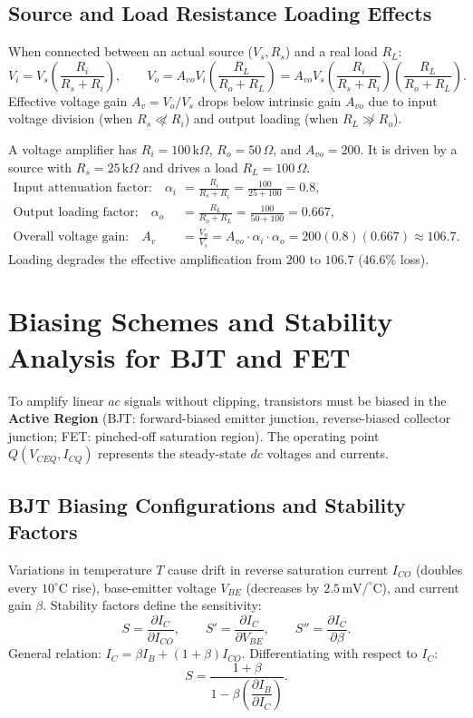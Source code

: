 \documentclass[12pt,a4paper]{article}
\begin{document}
\subsection{Source and Load Resistance Loading Effects}
When connected between an actual source ($V_s, R_s$) and a real load $R_L$:
\[
V_i = V_s \left(\frac{R_i}{R_s + R_i}\right),\qquad
V_o = A_{vo} V_i \left(\frac{R_L}{R_o + R_L}\right) = A_{vo} V_s \left(\frac{R_i}{R_s + R_i}\right)\left(\frac{R_L}{R_o + R_L}\right).
\]
Effective voltage gain $A_v = V_o/V_s$ drops below intrinsic gain $A_{vo}$ due to input voltage division (when $R_s \not\ll R_i$) and output loading (when $R_L \not\gg R_o$).

\begin{tcolorbox}[examplebox, title={Amplifier Loading Effect Calculation}]
A voltage amplifier has $R_i = 100\,\mathrm{k}\Omega$, $R_o = 50\,\Omega$, and $A_{vo} = 200$. It is driven by a source with $R_s = 25\,\mathrm{k}\Omega$ and drives a load $R_L = 100\,\Omega$.
\[
\begin{aligned}
\text{Input attenuation factor:}\quad \alpha_i &= \frac{R_i}{R_s + R_i} = \frac{100}{25 + 100} = 0.8,\\
\text{Output loading factor:}\quad \alpha_o &= \frac{R_L}{R_o + R_L} = \frac{100}{50 + 100} = 0.667,\\
\text{Overall voltage gain:}\quad A_v &= \frac{V_o}{V_s} = A_{vo}\cdot\alpha_i\cdot\alpha_o = 200(0.8)(0.667) \approx 106.7.
\end{aligned}
\]
Loading degrades the effective amplification from $200$ to $106.7$ ($46.6\%$ loss).
\end{tcolorbox}

\section{Biasing Schemes and Stability Analysis for BJT and FET}

\begin{tcolorbox}[defbox, title={Operating Point ($Q$-Point) and Stability}]
To amplify linear $ac$ signals without clipping, transistors must be biased in the \textbf{Active Region} (BJT: forward-biased emitter junction, reverse-biased collector junction; FET: pinched-off saturation region). The operating point $Q(V_{CEQ}, I_{CQ})$ represents the steady-state $dc$ voltages and currents.
\end{tcolorbox}

\subsection{BJT Biasing Configurations and Stability Factors}
Variations in temperature $T$ cause drift in reverse saturation current $I_{CO}$ (doubles every $10^\circ\mathrm{C}$ rise), base-emitter voltage $V_{BE}$ (decreases by $2.5\,\mathrm{mV/^\circ C}$), and current gain $\beta$. Stability factors define the sensitivity:
\[
S = \frac{\partial I_C}{\partial I_{CO}},\qquad
S' = \frac{\partial I_C}{\partial V_{BE}},\qquad
S'' = \frac{\partial I_C}{\partial \beta}.
\]
General relation: $I_C = \beta I_B + (1+\beta)I_{CO}$. Differentiating with respect to $I_C$:
\[
S = \frac{1 + \beta}{1 - \beta \left(\dfrac{\partial I_B}{\partial I_C}\right)}.
\]
\end{document}
